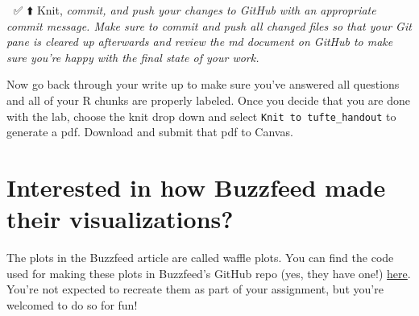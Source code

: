 \documentclass[
]{article}
\begin{document}
🧶 ✅ ⬆️ Knit, \emph{commit, and push your changes to GitHub with an
appropriate commit message. Make sure to commit and push all changed
files so that your Git pane is cleared up afterwards and review the md
document on GitHub to make sure you're happy with the final state of
your work.}

Now go back through your write up to make sure you've answered all
questions and all of your R chunks are properly labeled. Once you decide
that you are done with the lab, choose the knit drop down and select
\texttt{Knit\ to\ tufte\_handout} to generate a pdf. Download and submit
that pdf to Canvas.

\section{Interested in how Buzzfeed made their
visualizations?}\label{interested-in-how-buzzfeed-made-their-visualizations}

The plots in the Buzzfeed article are called waffle plots. You can find
the code used for making these plots in Buzzfeed's GitHub repo (yes,
they have one!)
\href{https://buzzfeednews.github.io/2017-01-immigration-and-science/}{here}.
You're not expected to recreate them as part of your assignment, but
you're welcomed to do so for fun!
\end{document}
